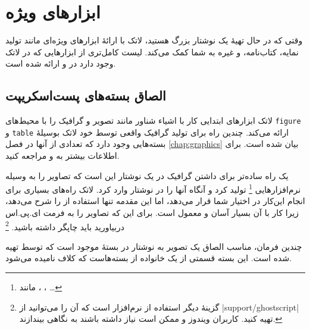 
\chapter{ابزارهای  ویژه}
\begin{intro}
وقتی که در حال تهیهٔ یک نوشتار‌ بزرگ هستید، لاتک با ارائهٔ ابزارهای ویژه‌ای مانند تولید نمایه، کتاب‌نامه، و غیره به شما کمک می‌کند. لیست کامل‌تری از  ابزار‌هایی که در لاتک وجود دارد در  
\manual{} و \companion
ارائه شده است.
\end{intro}
\section{الصاق بسته‌های پست‌اسکریپت}\label{eps}

لاتک ابزار‌های ابتدایی کار با اشیاء شناور مانند تصویر و گرافیک را با محیط‌های  \texttt{figure} و \texttt{table} ارائه می‌کند.
چندین راه برای تولید گرافیک واقعی توسط خود لاتک بوسیلهٔ بسته‌هایی وجود دارد که تعدادی از آنها در فصل  
\ref{chap:graphics}
بیان شده‌ است. برای اطلاعات بیشتر به  
 \manual{} و \companion{}مراجعه کنید.

یک راه ساده‌تر برای داشتن گرافیک در یک نوشتار‌ این است که تصاویر را به وسیله نرم‌\-افزارهایی%
\footnote{مانند ،  ، \ldots}
تولید کرد و آنگاه آنها را در نوشتار‌  وارد کرد. لاتک راه‌های بسیاری برای انجام این‌کار در اختیار شما قرار می‌دهد، اما این مقدمه تنها استفاده از  
\EPSi{}
 را شرح می‌دهد، زیرا کار با آن بسیار آسان و معمول است. برای این که تصاویر را به فرمت ای.پی.اس دربیاورید باید چاپگر  
\PSi
 داشته باشید.%
\footnote{گزینهٔ دیگر استفاده از  نرم‌افزار \textsc{} 
است که آن را می‌توانید از 
  \CTANref|support/ghostscript| تهیه کنید. کاربران ویندوز و  ممکن است نیاز داشته باشند به  \textsc{} نگاهی بیندازند.}

چندین فرمان، مناسب الصاق یک تصویر به نوشتار در بستهٔ 
 موجود است که توسط 
 تهیه شده است. این بسته قسمتی از یک خانواده از بسته‌هاست که کلاف 
نامیده می‌شود.%


